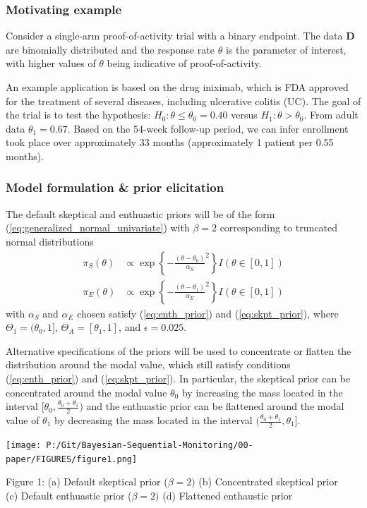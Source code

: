 \documentclass[12pt]{article}
\begin{document}
\subsubsection{Motivating example}
Consider a single-arm proof-of-activity trial with a binary endpoint. The data $\mathbf{D}$ are binomially distributed and the response rate $\theta$ is the parameter of interest, with higher values of $\theta$ being indicative of proof-of-activity. 

An example application is based on the drug iniximab, which is FDA approved for the treatment of several diseases, including ulcerative colitis (UC). The goal of the trial is to test the hypothesis: $H_0:\theta\leq\theta_0=0.40$ versus $H_1:\theta>\theta_0$. From adult data $\theta_1=0.67$. Based on the 54-week follow-up period, we can infer enrollment took place over approximately 33 months (approximately 1 patient per 0.55 months).

\subsubsection{Model formulation \& prior elicitation}
The default skeptical and enthuastic priors will be of the form (\ref{eq:generalized_normal_univariate}) with $\beta=2$ corresponding to truncated normal distributions
\begin{align*}
\pi_S(\theta)&\propto \exp\left\{-\frac{(\theta-\theta_0)}{\alpha_S}^2\right\} I(\theta\in[0,1])\\
\pi_E(\theta)&\propto \exp\left\{-\frac{(\theta-\theta_1)}{\alpha_E}^2\right\} I(\theta\in[0,1])
\end{align*}
with $\alpha_S$ and $\alpha_E$ chosen satisfy (\ref{eq:enth_prior}) and (\ref{eq:skpt_prior}), where $\Theta_1=(\theta_0,1]$, $\Theta_A=[\theta_1,1]$, and $\epsilon=0.025$.

Alternative specifications of the priors will be used to concentrate or flatten the distribution around the modal value, which still satisfy conditions (\ref{eq:enth_prior}) and (\ref{eq:skpt_prior}). In particular, the skeptical prior can be concentrated around the modal value $\theta_0$ by increasing the mass located in the interval $[\theta_0,\frac{\theta_0+\theta_1}{2})$ and the enthuastic prior can be flattened around the modal value of $\theta_1$ by decreasing the mass located in the interval $(\frac{\theta_0+\theta_1}{2},\theta_1]$.

\begin{center}
\texttt{[image: P:/Git/Bayesian-Sequential-Monitoring/00-paper/FIGURES/figure1.png]}

Figure 1: (a) Default skeptical prior ($\beta=2)$ (b) Concentrated skeptical prior\\ (c) Default enthuastic prior ($\beta=2)$ (d) Flattened enthaustic prior
\end{center}
\end{document}
